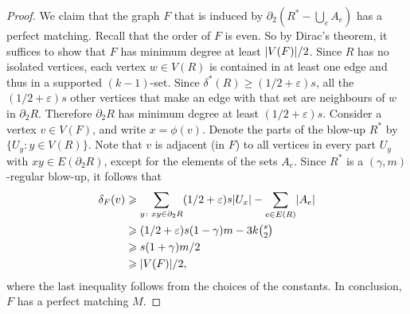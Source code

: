 \documentclass[12pt,reqno]{amsart}
\theoremstyle{plain}
\theoremstyle{definition}
\numberwithin{equation}{section}
\DeclarePairedDelimiter{\abs}{\lvert}{\rvert}
\renewcommand{\epsilon}{\varepsilon}
\renewcommand{\ge}{\geqslant}
\renewcommand{\geq}{\geqslant}
\newcommand{\eps}{\varepsilon}
\newcommand{\comin}{\delta^{\ast}}
\begin{document}
\begin{proof}
		We claim that the graph $F$ that is induced by $\partial_2 (R^\ast - \bigcup_e A_e)$ has a perfect matching.
		Recall that the order of $F$ is even.
		So by Dirac's theorem, it suffices to show that $F$ has minimum degree at least $\abs{V(F)}/2$.
		Since $R$ has no isolated vertices, each vertex $w \in V(R)$ is contained in at least one edge and thus in a supported $(k-1)$-set.
		Since $\comin(R) \ge (1/2 + \eps)s$, all the $(1/2+\epsilon)s$ other vertices that make an edge with that set are neighbours of $w$ in $\partial_2 R$.
		Therefore $\partial_2 R$ has minimum degree at least $(1/2 +\eps)s$.
		Consider a vertex $v \in V(F)$, and write $x = \phi(v)$.
		Denote the parts of the blow-up $R^\ast$ by $\{U_y\colon y \in V(R)\}$.
		Note that $v$ is adjacent (in $F$) to all vertices in every part $U_y$ with $xy \in E(\partial_2 R)$, except for the elements of the sets $A_e$.
		Since $R^\ast$ is a $(\gamma, m)$-regular blow-up, it follows that
		\begin{align*}
			\delta_{F}(v) & \geq \sum_{y\colon xy \in \partial_2 R}(1/2 +\eps)s \abs{U_x} - \sum_{e\in E(R)} \abs{A_e} \\
			& \geq(1/2 +\eps)s (1-\gamma)m - 3k\tbinom{s}{2}                                             \\
			& \geq s(1+\gamma)m/2                                                                        \\
			& \geq \abs{V(F)}/2,
		\end{align*}
		where the last inequality follows from the choices of the constants.
		In conclusion, $F$ has a perfect matching $M$.
		

\end{proof}
\end{document}
